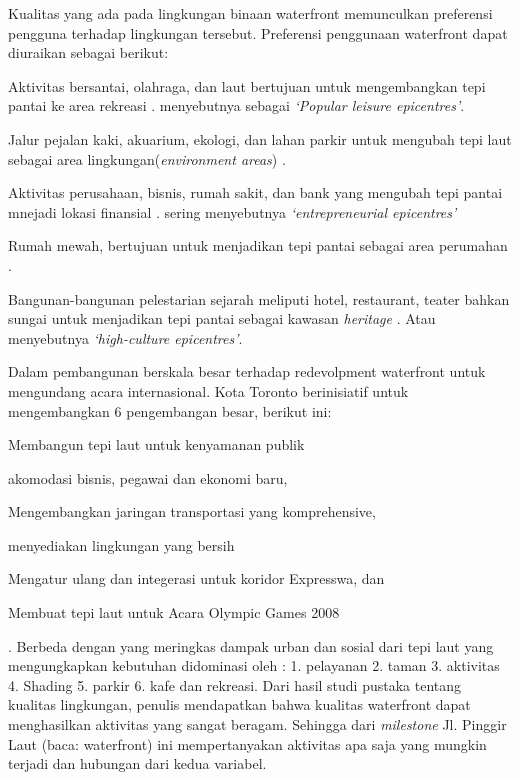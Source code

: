 \documentclass[../thesis.tex]{subfiles}
\begin{document}
Kualitas yang ada pada lingkungan binaan waterfront memunculkan preferensi pengguna terhadap lingkungan tersebut. Preferensi penggunaan waterfront dapat diuraikan sebagai berikut:
\begin{inparaenum}
\item  Aktivitas bersantai, olahraga, dan laut bertujuan untuk mengembangkan tepi pantai ke area rekreasi \citep{breen1994waterfronts}. \cite{gospodini2009} menyebutnya sebagai \textit{`Popular leisure epicentres'}.
\item Jalur pejalan kaki, akuarium, ekologi, dan lahan parkir untuk mengubah tepi laut sebagai area lingkungan(\textit{environment areas}) \citep{costa1990logical}.
\item Aktivitas perusahaan, bisnis, rumah sakit, dan bank yang mengubah tepi pantai mnejadi lokasi finansial \citep{hoyle1999scale} \citep{hoyle2000confrontation}. \cite{gospodini2009} sering menyebutnya \textit{`entrepreneurial epicentres'}
\item Rumah mewah, bertujuan untuk menjadikan tepi pantai sebagai area perumahan \citep{dong2004waterfront}.
\item Bangunan-bangunan pelestarian sejarah meliputi hotel, restaurant, teater bahkan sungai untuk menjadikan tepi pantai sebagai kawasan \textit{heritage} \citep{macleod1999}. Atau \cite{gospodini2009} menyebutnya \textit{`high-culture epicentres'}.
	\end{inparaenum}

	Dalam pembangunan berskala besar terhadap redevolpment waterfront untuk mengundang acara internasional. Kota Toronto berinisiatif untuk mengembangkan 6 pengembangan besar, berikut ini: \begin{inparaenum}\item Membangun tepi laut untuk kenyamanan publik \item akomodasi bisnis, pegawai dan ekonomi baru, \item Mengembangkan jaringan transportasi yang komprehensive, \item menyediakan lingkungan yang bersih \item Mengatur ulang dan integerasi untuk koridor Expresswa, dan \item Membuat tepi laut untuk Acara Olympic Games 2008\end{inparaenum}\citep{white2016}. Berbeda dengan \citep{mostafa2017} yang meringkas dampak urban dan sosial dari tepi laut yang mengungkapkan kebutuhan didominasi oleh : 1. pelayanan 2. taman 3. aktivitas 4. Shading 5. parkir 6. kafe dan rekreasi.
Dari hasil studi pustaka tentang kualitas lingkungan, penulis mendapatkan bahwa kualitas waterfront dapat menghasilkan aktivitas yang sangat beragam. Sehingga dari \textit{milestone} Jl. Pinggir Laut (baca: waterfront) ini mempertanyakan aktivitas apa saja yang mungkin terjadi dan hubungan dari kedua variabel.
\end{document}
